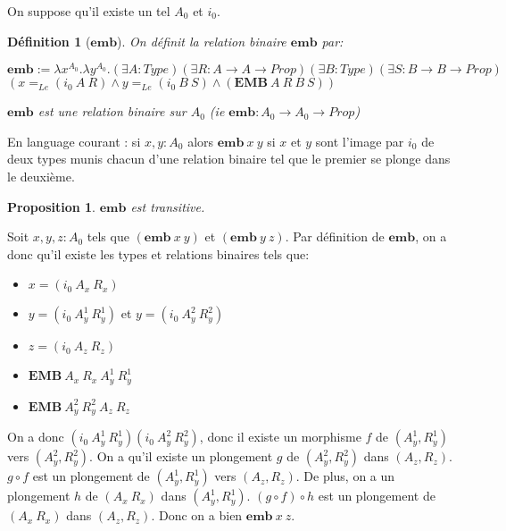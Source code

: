 \documentclass[a4paper,12pt]{article}
\theoremstyle{plain}
\newtheorem{prop}[theo]{Proposition}
\newtheorem{defi}[theo]{Définition}
\newenvironment{demo}[1][]
 {\if\relax\detokenize{#1}\relax
    \renewcommand\theproofinner{\thetheo}%
  \else
    \renewcommand{\theproofinner}{#1}%
  \fi
  \proofinner}
 {\endproofinner}
\begin{document}
On suppose qu'il existe un tel $A_0$ et $i_0$.

\begin{defi}[$\mathbf{emb}$] On définit la relation binaire $\mathbf{emb}$ par:
\begin{center}
$\mathbf{emb}:= \lambda x^{A_0}. \lambda y^{A_0}.(\exists A : \mathit{Type})(\exists R : A \to A \to \mathit{Prop})(\exists B : \mathit{Type})(\exists S : B \to B \to \mathit{Prop})$\\[3mm]
$( x =_{\mathit{Le}}(i_0 \ A \ R) \land y =_{\mathit{Le}}(i_0 \ B \ S) \land (\mathbf{EMB}\ A \ R \ B \ S))$
\end{center}
$\mathbf{emb}$ est une relation binaire sur $A_0$ (ie  $\mathbf{emb}: A_0 \to A_0 \to \mathit{Prop}$)
\end{defi}

En language courant : si $x, y: A_0$ alors $\mathbf{emb}\ x \ y$ si $x$ et $y$ sont l'image par $i_0$ de deux types munis chacun d'une relation binaire tel que le premier se plonge dans le deuxième.

\begin{prop}
$\mathbf{emb}$ est transitive.
\end{prop}

\begin{demo} Soit $x,y,z : A_0$ tels que $(\mathbf{emb}\ x \ y)$ et $(\mathbf{emb}\ y \ z)$. Par définition de $\mathbf{emb}$, on a donc qu'il existe les types et relations binaires tels que:

\begin{itemize}
\setlength\itemsep{ -1.5 em}
\item $x = (i_0 \ A_x \ R_x)$\\
\item $y = (i_0 \ A^1_y \ R^1_y)$ et $ y = (i_0 \ A^2_y \ R^2_y)$\\
\item $z = (i_0 \ A_z \ R_z)$\\
\item $ \mathbf{EMB}\ A_x \ R_x \ A^1_y \ R^1_y$\\
\item $ \mathbf{EMB}\ A^2_y \ R^2_y \ A_z \ R_z$
\end{itemize}

On a donc $ (i_0 ~A^1_y ~R^1_y)  (i_0 ~A^2_y ~R^2_y)$, donc il existe un morphisme $f$ de $(A^1_y, R^1_y)$ vers $(A^2_y, R^2_y)$. On a qu'il existe un plongement $g$ de $(A^2_y, R^2_y)$ dans $(A_z, R_z)$. $g {\circ} f$ est un plongement de $(A^1_y, R^1_y)$ vers $(A_z, R_z)$. De plus, on a un plongement $h$ de $(A_x \ R_x)$ dans $(A^1_y, R^1_y)$. $(g {\circ} f ) {\circ} h$ est un plongement de $(A_x \ R_x)$ dans $(A_z, R_z)$. Donc on a bien $\mathbf{emb}\ x \ z$.
\end{demo}
\end{document}
